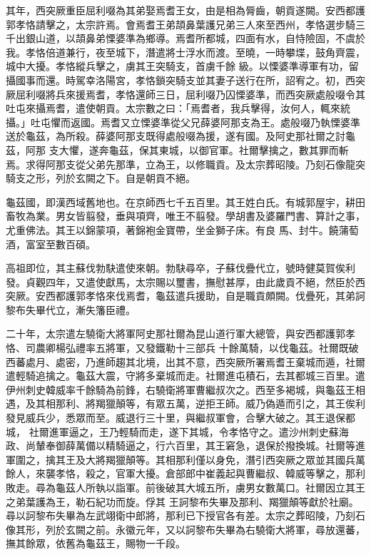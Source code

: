 \begin{pinyinscope}
 其年，西突厥重臣屈利啜為其弟娶焉耆王女，由是相為脣齒，朝貢遂闕。安西都護郭孝恪請擊之，太宗許焉。會焉耆王弟頡鼻葉護兄弟三人來至西州，孝恪選步騎三千出銀山道，以頡鼻弟慄婆準為鄉導。焉耆所都城，四面有水，自恃險固，不虞於我。孝恪倍道兼行，夜至城下，潛遣將士浮水而渡。至曉，一時攀堞，鼓角齊震，城中大擾。孝恪縱兵擊之，虜其王突騎支，首虜千餘
 級。以慄婆準導軍有功，留攝國事而還。時駕幸洛陽宮，孝恪鎖突騎支並其妻子送行在所，詔宥之。初，西突厥屈利啜將兵來援焉耆，孝恪還師三日，屈利啜乃囚慄婆準，而西突厥處般啜令其吐屯來攝焉耆，遣使朝貢。太宗數之曰：「焉耆者，我兵擊得，汝何人，輒來統攝。」吐屯懼而返國。焉耆又立慄婆準從父兄薛婆阿那支為王。處般啜乃執慄婆準送於龜茲，為所殺。薛婆阿那支既得處般啜為援，遂有國。及阿史那社爾之討龜茲，阿那
 支大懼，遂奔龜茲，保其東城，以御官軍。社爾擊擒之，數其罪而斬焉。求得阿那支從父弟先那準，立為王，以修職貢。及太宗葬昭陵。乃刻石像龍突騎支之形，列於玄闕之下。自是朝貢不絕。



 龜茲國，即漢西域舊地也。在京師西七千五百里。其王姓白氏。有城郭屋宇，耕田畜牧為業。男女皆翦發，垂與項齊，唯王不翦發。學胡書及婆羅門書、算計之事，尤重佛法。其王以錦蒙項，著錦袍金寶帶，坐金獅子床。有良
 馬、封牛。饒蒲萄酒，富室至數百碩。



 高祖即位，其主蘇伐勃駃遣使來朝。勃駃尋卒，子蘇伐疊代立，號時健莫賀俟利發。貞觀四年，又遣使獻馬，太宗賜以璽書，撫慰甚厚，由此歲貢不絕，然臣於西突厥。安西都護郭孝恪來伐焉耆，龜茲遣兵援助，自是職貢頗闕。伐疊死，其弟訶黎布失畢代立，漸失籓臣禮。



 二十年，太宗遣左驍衛大將軍阿史那社爾為昆山道行軍大總管，與安西都護郭孝恪、司農卿楊弘禮率五將軍，又發鐵勒十三部兵
 十餘萬騎，以伐龜茲。社爾既破西蕃處月、處密，乃進師趨其北境，出其不意，西突厥所署焉耆王棄城而遁，社爾遣輕騎追擒之。龜茲大震，守將多棄城而走。社爾進屯積石，去其都城三百里。遣伊州刺史韓威率千餘騎為前鋒，右驍衛將軍曹繼叔次之。西至多褐城，與龜茲王相遇，及其相那利、將羯獵顛等，有眾五萬，逆拒王師。威乃偽遁而引之，其王俟利發見威兵少，悉眾而至。威退行三十里，與繼叔軍會，合擊大破之。其王退保都城，
 社爾進軍逼之，王乃輕騎而走，遂下其城，令孝恪守之。遣沙州刺史蘇海政、尚輦奉御薛萬備以精騎逼之，行六百里，其王窘急，退保於撥換城。社爾等進軍圍之，擒其王及大將羯獵顛等。其相那利僅以身免，潛引西突厥之眾並其國兵萬餘人，來襲孝恪，殺之，官軍大擾。倉部郎中崔義起與曹繼叔、韓威等擊之，那利敗走。尋為龜茲人所執以詣軍。前後破其大城五所，虜男女數萬口。社爾因立其王之弟葉護為王，勒石紀功而旋。俘其
 王訶黎布失畢及那利、羯獵顛等獻於社廟。尋以訶黎布失畢為左武翊衛中郎將，那利已下授官各有差。太宗之葬昭陵，乃刻石像其形，列於玄闕之前。永徽元年，又以訶黎布失畢為右驍衛大將軍，尋放還蕃，撫其餘眾，依舊為龜茲王，賜物一千段。




\end{pinyinscope}
